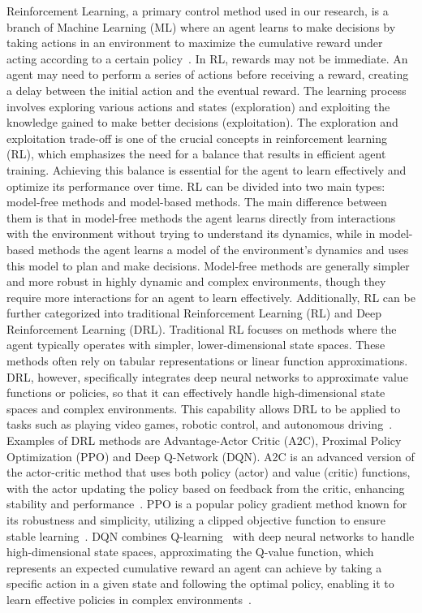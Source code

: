 Reinforcement Learning, a primary control method used in our research, is a branch of Machine Learning (ML) where an agent learns to make decisions by taking actions in an environment to maximize the cumulative reward under acting according to a certain policy~\cite{sutton_reinforcement_2018}. In RL, rewards may not be immediate. An agent may need to perform a series of actions before receiving a reward, creating a delay between the initial action and the eventual reward. The learning process involves exploring various actions and states (exploration) and exploiting the knowledge gained to make better decisions (exploitation). The exploration and exploitation trade-off is one of the crucial concepts in reinforcement learning (RL), which emphasizes the need for a balance that results in efficient agent training. Achieving this balance is essential for the agent to learn effectively and optimize its performance over time. RL can be divided into two main types: model-free methods and model-based methods. The main difference between them is that in model-free methods the agent learns directly from interactions with the environment without trying to understand its dynamics, while in model-based methods the agent learns a model of the environment's dynamics and uses this model to plan and make decisions. Model-free methods are generally simpler and more robust in highly dynamic and complex environments, though they require more interactions for an agent to learn effectively. 
Additionally, RL can be further categorized into traditional Reinforcement Learning (RL) and Deep Reinforcement Learning (DRL). Traditional RL focuses on methods where the agent typically operates with simpler, lower-dimensional state spaces. These methods often rely on tabular representations or linear function approximations. DRL, however, specifically integrates deep neural networks to approximate value functions or policies, so that it can effectively handle high-dimensional state spaces and complex environments. This capability allows DRL to be applied to tasks such as playing video games, robotic control, and autonomous driving~\cite{roveda2020mbrl, mnih2013dqn, zhu2022inverted}. Examples of DRL methods are Advantage-Actor Critic (A2C), Proximal Policy Optimization (PPO) and Deep Q-Network (DQN). A2C is an advanced version of the actor-critic method that uses both policy (actor) and value (critic) functions, with the actor updating the policy based on feedback from the critic, enhancing stability and performance~\cite{mnih2016a2c}. PPO is a popular policy gradient method known for its robustness and simplicity, utilizing a clipped objective function to ensure stable learning~\cite{schulman2017ppo}. DQN combines Q-learning~\cite{sutton_reinforcement_2018} with deep neural networks to handle high-dimensional state spaces, approximating the Q-value function, which represents an expected cumulative reward an agent can achieve by taking a specific action in a given state and following the optimal policy, enabling it to learn effective policies in complex environments~\cite{mnih2013dqn}. 
